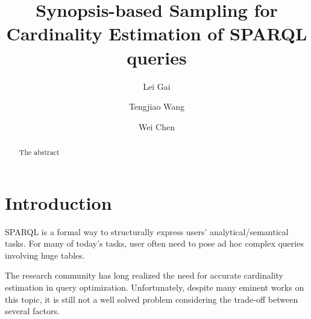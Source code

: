 \documentclass[runningheads]{llncs}
\begin{document}
%
\title{Synopsis-based Sampling for Cardinality Estimation of SPARQL queries}
%
%
\author{Lei Gai \and
Tengjiao Wang \and
Wei Chen}
%
%

%
\maketitle              %
%
%
%
\begin{abstract}
The abstract 

\end{abstract}
%
%
%
%
%
\section{Introduction}
%
SPARQL is a formal way to structurally express users' analytical/semantical tasks. For many of today's tasks, user often need to pose ad hoc complex queries involving huge tables.

The research community has long realized the need for accurate cardinality estimation in query optimization. Unfortunately, despite many eminent works on this topic, it is still not a well solved problem considering the trade-off between several factors.
\end{document}
